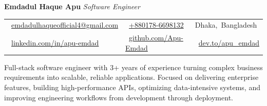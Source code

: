 \documentclass[a4paper]{article}
\newcommand{\icon}[1]{\BeginAccSupp{method=escape,ActualText={}}#1\EndAccSupp{}}
\newcommand{\bodyfont}{%
  \fontsize{11pt}{13pt}\selectfont
}
\begin{document}
\bodyfont


{\fontsize{16pt}{19.2pt}\selectfont\bfseries
  Emdadul Haque Apu}
\hspace{6pt}
{\fontsize{13pt}{15.6pt}\selectfont\itshape
  Software Engineer}

\par\vspace{11pt}

\begin{tabular*}{\textwidth}{@{\extracolsep{\fill}}lll}
  \mbox{\icon{\faEnvelope}\hspace{6pt}
    \href{mailto:emdadulhaqueofficial4@gmail.com}
    {emdadulhaqueofficial4@gmail.com}}
  &
  \mbox{\icon{\faPhone}\hspace{6pt}
    \href{tel:+8801786698132}
    {+880178-6698132}}
  &
  \mbox{\icon{\faMapMarker*}\hspace{6pt}Dhaka, Bangladesh}
  \\
  [9pt]
  \mbox{\icon{\faLinkedin}\hspace{6pt}
    \href{https://linkedin.com/in/apu-emdad}
    {linkedin.com/in/apu-emdad}}
  &
  \mbox{\icon{\faGithub}\hspace{6pt}
    \href{https://github.com/Apu-Emdad}
    {github.com/Apu-Emdad}}
  &
  \mbox{\icon{\faDev}\hspace{6pt}
    \href{https://dev.to/apu_emdad}
    {dev.to/apu\_emdad}}
\end{tabular*}

\par\vspace{16pt}


Full-stack software engineer with 3+ years of experience turning complex business requirements into scalable, reliable applications. Focused on delivering enterprise features, building high-performance APIs, optimizing data-intensive systems, and improving engineering workflows from development through deployment.\par

\end{document}
